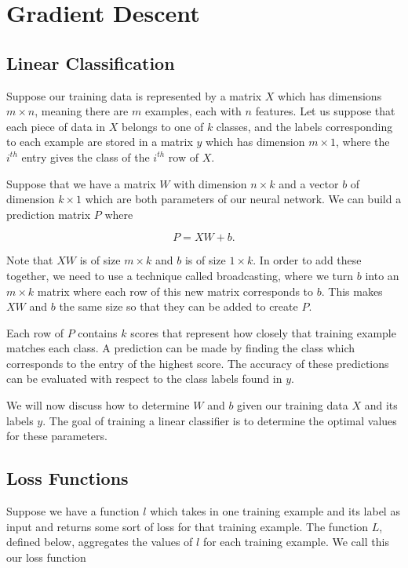 \newpage
\section{Gradient Descent}\label{ch:gradient_descent} 


\subsection{Linear Classification}

Suppose our training data is represented by a matrix $X$ which has dimensions
$m \times n$, meaning there are $m$ examples, each with $n$ features. Let us
suppose that each piece of data in $X$ belongs to one of $k$ classes, and the
labels corresponding to each example are stored in a matrix $y$ which has
dimension $m \times 1$, where the $i^{th}$ entry gives the class of the
$i^{th}$ row of $X$.

Suppose that we have a matrix $W$ with dimension $n \times k$ and a vector $b$
of dimension $k \times 1$ which are both parameters of our neural network. We
can build a prediction matrix $P$ where

\[
P = XW + b.
\]

Note that $XW$ is of size $m \times k$ and $b$ is of size $1 \times k$.
In order to add these together, we need to use a technique
called broadcasting, where we turn $b$ into an $m \times k$ matrix where each
row of this new matrix corresponds to $b$. This makes $XW$ and $b$ the
same size so that they can be added to create $P$.

Each row of $P$ contains $k$ scores that represent how closely that
training example matches each class. A prediction can be made by finding the
class which corresponds to the entry of the highest score. The accuracy of
these predictions can be evaluated with respect to the class labels found in
$y$.

We will now discuss how to determine $W$ and $b$ given our training data $X$
and its labels $y$. The goal of training a linear classifier is to determine
the optimal values for these parameters.

\subsection{Loss Functions}

Suppose we have a function $l$ which takes in one training example and its
label as input and returns some sort of loss for that training example.  The
function $L$, defined below, aggregates the values of $l$ for each training
example. We call this our loss function

